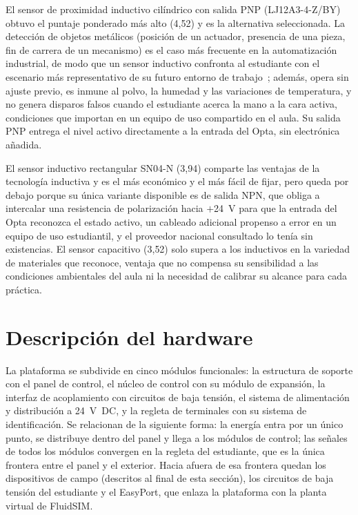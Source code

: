 \documentclass[12pt,a4paper,oneside]{report}
\begin{document}
El sensor de proximidad inductivo cilíndrico con salida PNP (LJ12A3-4-Z/BY) obtuvo el puntaje ponderado más alto (4{,}52) y es la alternativa seleccionada. La detección de objetos metálicos (posición de un actuador, presencia de una pieza, fin de carrera de un mecanismo) es el caso más frecuente en la automatización industrial, de modo que un sensor inductivo confronta al estudiante con el escenario más representativo de su futuro entorno de trabajo~\cite{ref23}; además, opera sin ajuste previo, es inmune al polvo, la humedad y las variaciones de temperatura, y no genera disparos falsos cuando el estudiante acerca la mano a la cara activa, condiciones que importan en un equipo de uso compartido en el aula. Su salida PNP entrega el nivel activo directamente a la entrada del Opta, sin electrónica añadida.

El sensor inductivo rectangular SN04-N (3{,}94) comparte las ventajas de la tecnología inductiva y es el más económico y el más fácil de fijar, pero queda por debajo porque su única variante disponible es de salida NPN, que obliga a intercalar una resistencia de polarización hacia $+$24~V para que la entrada del Opta reconozca el estado activo, un cableado adicional propenso a error en un equipo de uso estudiantil, y el proveedor nacional consultado lo tenía sin existencias. El sensor capacitivo (3{,}52) solo supera a los inductivos en la variedad de materiales que reconoce, ventaja que no compensa su sensibilidad a las condiciones ambientales del aula ni la necesidad de calibrar su alcance para cada práctica.


\section{Descripción del hardware}
\label{sec:hardware}

La plataforma se subdivide en cinco módulos funcionales: la estructura de soporte con el panel de control, el núcleo de control con su módulo de expansión, la interfaz de acoplamiento con circuitos de baja tensión, el sistema de alimentación y distribución a 24~V~DC, y la regleta de terminales con su sistema de identificación. Se relacionan de la siguiente forma: la energía entra por un único punto, se distribuye dentro del panel y llega a los módulos de control; las señales de todos los módulos convergen en la regleta del estudiante, que es la única frontera entre el panel y el exterior. Hacia afuera de esa frontera quedan los dispositivos de campo (descritos al final de esta sección), los circuitos de baja tensión del estudiante y el EasyPort, que enlaza la plataforma con la planta virtual de FluidSIM.
\end{document}
